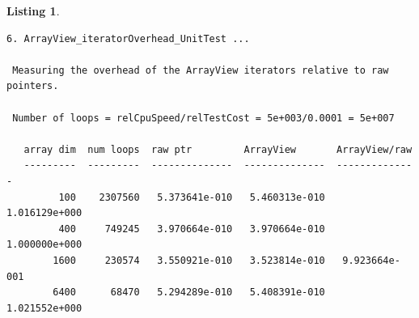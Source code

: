 \documentclass[pdf,ps2pdf,11pt]{SANDreport}
\newtheorem{listing}{Listing}
\begin{document}
\begin{listing}
{\begin{verbatim}
6. ArrayView_iteratorOverhead_UnitTest ... 
 
 Measuring the overhead of the ArrayView iterators relative to raw pointers.
 
 Number of loops = relCpuSpeed/relTestCost = 5e+003/0.0001 = 5e+007
 
   array dim  num loops  raw ptr         ArrayView       ArrayView/raw 
   ---------  ---------  --------------  --------------  --------------
         100    2307560   5.373641e-010   5.460313e-010   1.016129e+000
         400     749245   3.970664e-010   3.970664e-010   1.000000e+000
        1600     230574   3.550921e-010   3.523814e-010   9.923664e-001
        6400      68470   5.294289e-010   5.408391e-010   1.021552e+000
\end{verbatim}}
\end{listing}


\begin{SANDdistribution}[NM]
\end{SANDdistribution}
\end{document}

